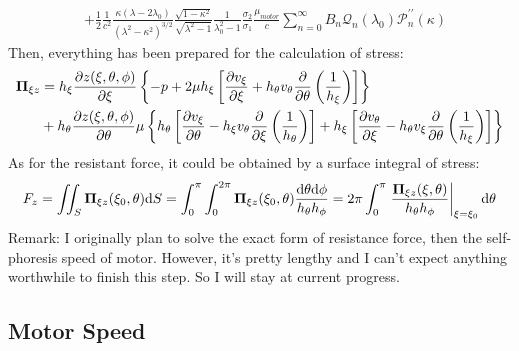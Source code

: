 \documentclass[fontsize=11pt, %
                             paper=a4, %
                             twoside, %
                             captions=tableheading,
                             index=totoc,
                             hyperref]{labbook}
\begin{document}
\begin{addmargin}[4cm]{0cm}
\begin{equation}
\begin{aligned}
&+\frac{1}{2}\frac{1}{c^2}\frac{\kappa(\lambda-2\lambda_0)}{(\lambda^2-\kappa^2)^{3/2}}\frac{\sqrt{1-\kappa^2}}{\sqrt{\lambda^2-1}}\frac{1}{\lambda_0^2-1}\frac{\sigma_2}{\sigma_1}\frac{\mu_{motor}}{c}\sum_{n=0}^\infty B_n \mathscr{Q}_n(\lambda_0)\mathscr{P}_n^{\prime\prime}(\kappa)
\end{aligned}
\end{equation}
Then, everything has been prepared for the calculation of stress:
\begin{equation}
\begin{aligned}
\mbox{\boldmath$ \Pi $}_{\xi z}&=
h_\xi\frac{\partial z(\xi,\theta,\phi)}{\partial \xi} \left\{-p+2\mu h_\xi \left[\frac{\partial v_\xi}{\partial \xi}+h_\theta v_\theta \frac{\partial }{\partial \theta}\left(\frac{1}{h_\xi}\right)\right]\right\}\\
&+h_\theta\frac{\partial z(\xi,\theta,\phi)}{\partial \theta} \mu \left\{h_\theta\left[\frac{\partial v_\xi}{\partial \theta}-h_\xi v_\theta \frac{\partial }{\partial \xi}\left(\frac{1}{h_\theta}\right)\right]+h_\xi\left[\frac{\partial v_\theta}{\partial \xi}-h_\theta v_\xi \frac{\partial }{\partial \theta}\left(\frac{1}{h_\xi}\right)\right]\right\}\\
\end{aligned}
\end{equation}
As for the resistant force, it could be obtained by a surface integral of stress:
\begin{equation}
F_z=\iint_S\mbox{\boldmath$ \Pi $}_{\xi z}(\xi_0,\theta)\mathrm{d}S=\int_0^\pi\int_0^{2\pi} \mbox{\boldmath$ \Pi $}_{\xi z}(\xi_0,\theta)\frac{\mathrm{d}\theta\mathrm{d}\phi}{h_\theta h_\phi}=2\pi\int_0^\pi \left.\frac{\mbox{\boldmath$ \Pi $}_{\xi z}(\xi,\theta)}{h_\theta h_\phi}\right|_{\xi=\xi_0}\mathrm{d}\theta
\end{equation}
Remark:
I originally plan to solve the exact form of resistance force, then the self-phoresis speed of motor. However, it's pretty lengthy and I can't expect anything worthwhile to finish this step. So I will stay at current progress.
\subsection{Motor Speed}

\end{addmargin}
\end{document}
